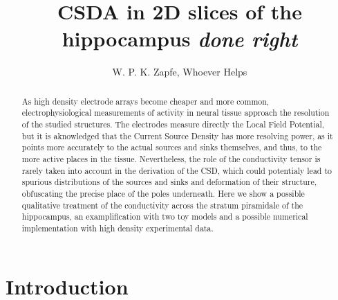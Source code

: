 \documentclass{article}
\title{CSDA in 2D slices of the hippocampus \emph{done right}}
\author{W. P. K. Zapfe, Whoever Helps}
\begin{document}
\maketitle

\begin{abstract}
As high density electrode arrays become cheaper and more common, 
electrophysiological measurements of activity in neural tissue approach
the resolution of the studied structures. The electrodes measure
directly the Local Field Potential, but it is aknowledged that the
Current Source Density has more resolving power, as it points
more accurately to the actual sources and sinks themselves,
and thus, to the more active places in the tissue. Nevertheless,
the role of the conductivity tensor is rarely taken into account
in the derivation of the CSD, which could potentialy lead to
spurious distributions of the sources and sinks and deformation
of their structure, obfuscating the precise place of the
poles underneath.
Here we show a possible qualitative treatment of the conductivity
across the stratum piramidale of the hippocampus, an examplification
with two toy models and a possible numerical implementation with
high density experimental data.
\end{abstract}


\section{Introduction}
\end{document}
